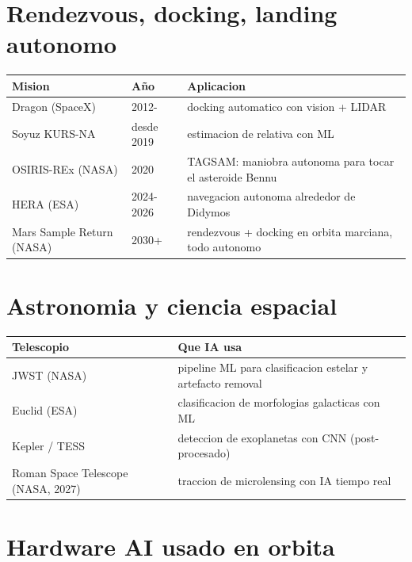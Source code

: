 \documentclass[11pt,a4paper,oneside]{report}
\begin{document}
\chapter{Rendezvous, docking, landing autonomo}

\begin{longtable}{p{4cm}p{2.5cm}p{8cm}}
\toprule
\textbf{Mision} & \textbf{Año} & \textbf{Aplicacion} \\
\midrule
\endhead
Dragon (SpaceX)              & 2012-      & docking automatico con vision + LIDAR \\
Soyuz KURS-NA                & desde 2019 & estimacion de relativa con ML \\
OSIRIS-REx (NASA)            & 2020       & TAGSAM: maniobra autonoma para tocar el asteroide Bennu \\
HERA (ESA)                   & 2024-2026  & navegacion autonoma alrededor de Didymos \\
Mars Sample Return (NASA)    & 2030+      & rendezvous + docking en orbita marciana, todo autonomo \\
\bottomrule
\end{longtable}

\chapter{Astronomia y ciencia espacial}

\begin{longtable}{p{4cm}p{10cm}}
\toprule
\textbf{Telescopio} & \textbf{Que IA usa} \\
\midrule
\endhead
JWST (NASA)                          & pipeline ML para clasificacion estelar y artefacto removal \\
Euclid (ESA)                         & clasificacion de morfologias galacticas con ML \\
Kepler / TESS                        & deteccion de exoplanetas con CNN (post-procesado) \\
Roman Space Telescope (NASA, 2027)   & traccion de microlensing con IA tiempo real \\
\bottomrule
\end{longtable}

\chapter{Hardware AI usado en orbita}
\end{document}
